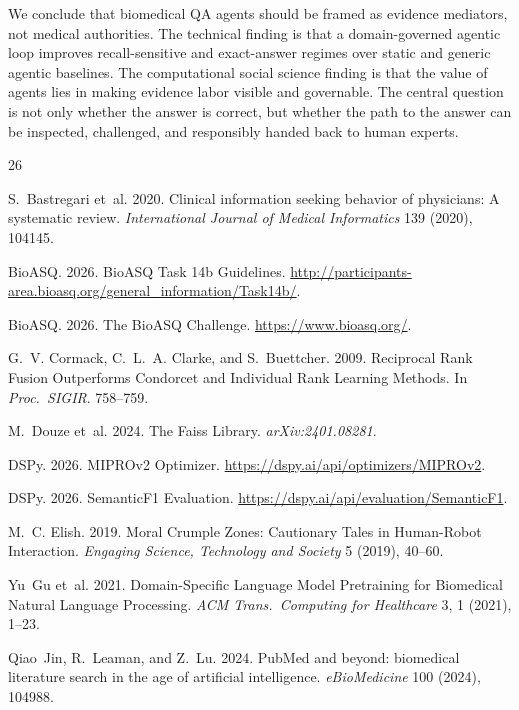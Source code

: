 \documentclass[sigconf,nonacm]{acmart}
\begin{document}
We conclude that biomedical QA agents should be framed as evidence mediators, not medical authorities. The technical finding is that a domain-governed agentic loop improves recall-sensitive and exact-answer regimes over static and generic agentic baselines. The computational social science finding is that the value of agents lies in making evidence labor visible and governable. The central question is not only whether the answer is correct, but whether the path to the answer can be inspected, challenged, and responsibly handed back to human experts.


\begin{thebibliography}{26}

S.~Bastregari et~al. 2020. Clinical information seeking behavior of physicians: A systematic review. \emph{International Journal of Medical Informatics} 139 (2020), 104145.

BioASQ. 2026. BioASQ Task 14b Guidelines. \url{http://participants-area.bioasq.org/general_information/Task14b/}.

BioASQ. 2026. The BioASQ Challenge. \url{https://www.bioasq.org/}.

G.~V. Cormack, C.~L.~A. Clarke, and S.~Buettcher. 2009. Reciprocal Rank Fusion Outperforms Condorcet and Individual Rank Learning Methods. In \emph{Proc.\ SIGIR}. 758--759.

M.~Douze et~al. 2024. The Faiss Library. \emph{arXiv:2401.08281}.

DSPy. 2026. MIPROv2 Optimizer. \url{https://dspy.ai/api/optimizers/MIPROv2}.

DSPy. 2026. SemanticF1 Evaluation. \url{https://dspy.ai/api/evaluation/SemanticF1}.

M.~C. Elish. 2019. Moral Crumple Zones: Cautionary Tales in Human-Robot Interaction. \emph{Engaging Science, Technology and Society} 5 (2019), 40--60.

Yu~Gu et~al. 2021. Domain-Specific Language Model Pretraining for Biomedical Natural Language Processing. \emph{ACM Trans.\ Computing for Healthcare} 3, 1 (2021), 1--23.

Qiao~Jin, R.~Leaman, and Z.~Lu. 2024. PubMed and beyond: biomedical literature search in the age of artificial intelligence. \emph{eBioMedicine} 100 (2024), 104988.


\end{thebibliography}
\end{document}
